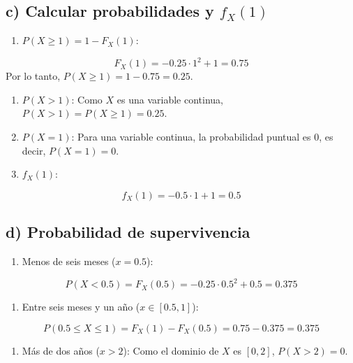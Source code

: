 \documentclass[
]{article}
\providecommand{\tightlist}{%
  \setlength{\itemsep}{0pt}\setlength{\parskip}{0pt}}
\begin{document}
\subsection{\texorpdfstring{c) Calcular probabilidades y \(f_X(1)\)}{c) Calcular probabilidades y f\_X(1)}}\label{c-calcular-probabilidades-y-f_x1}

\begin{enumerate}
\def\labelenumi{\arabic{enumi}.}
\tightlist
\item
  \(P(X \geq 1) = 1 - F_X(1)\):
\end{enumerate}

\[
F_X(1) = -0.25 \cdot 1^2 + 1 = 0.75
\]
Por lo tanto, \(P(X \geq 1) = 1 - 0.75 = 0.25\).

\begin{enumerate}
\def\labelenumi{\arabic{enumi}.}
\setcounter{enumi}{1}
\item
  \(P(X > 1)\): Como \(X\) es una variable continua, \(P(X > 1) = P(X \geq 1) = 0.25\).
\item
  \(P(X = 1)\): Para una variable continua, la probabilidad puntual es 0, es decir, \(P(X = 1) = 0\).
\item
  \(f_X(1)\):
\end{enumerate}

\[
f_X(1) = -0.5 \cdot 1 + 1 = 0.5
\]

\subsection{d) Probabilidad de supervivencia}\label{d-probabilidad-de-supervivencia}

\begin{enumerate}
\def\labelenumi{\arabic{enumi}.}
\tightlist
\item
  Menos de seis meses (\(x = 0.5\)):
\end{enumerate}

\[
P(X < 0.5) = F_X(0.5) = -0.25 \cdot 0.5^2 + 0.5 = 0.375
\]

\begin{enumerate}
\def\labelenumi{\arabic{enumi}.}
\setcounter{enumi}{1}
\tightlist
\item
  Entre seis meses y un año (\(x \in [0.5, 1]\)):
\end{enumerate}

\[
P(0.5 \leq X \leq 1) = F_X(1) - F_X(0.5) = 0.75 - 0.375 = 0.375
\]

\begin{enumerate}
\def\labelenumi{\arabic{enumi}.}
\setcounter{enumi}{2}
\tightlist
\item
  Más de dos años (\(x > 2\)): Como el dominio de \(X\) es \([0, 2]\), \(P(X > 2) = 0\).
\end{enumerate}
\end{document}
